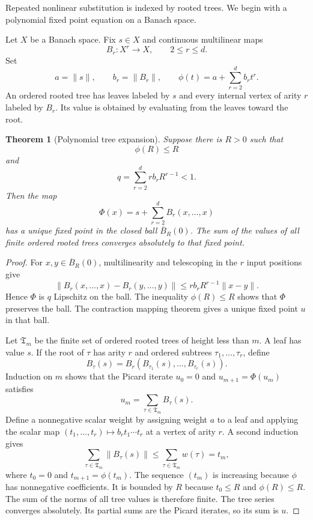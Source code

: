 \documentclass[11pt,a4paper]{article}
\newtheorem{theorem}{Theorem}[section]
\theoremstyle{plain}
\theoremstyle{definition}
\theoremstyle{remark}
\begin{document}
Repeated nonlinear substitution is indexed by rooted trees.  We begin with a polynomial fixed point equation on a Banach space.

Let $X$ be a Banach space.  Fix $s\in X$ and continuous multilinear maps
\[
B_r:X^r\longrightarrow X,
\qquad
2\le r\le d.
\]
Set
\[
a=\|s\|,
\qquad
b_r=\|B_r\|,
\qquad
\phi(t)=a+\sum_{r=2}^{d}b_rt^r.
\]
An ordered rooted tree has leaves labeled by $s$ and every internal vertex of arity $r$ labeled by $B_r$.  Its value is obtained by evaluating from the leaves toward the root.

\begin{theorem}[Polynomial tree expansion]\label{thm:polynomial_tree_expansion}
Suppose there is $R>0$ such that
\[
\phi(R)\le R
\]
and
\[
q=
\sum_{r=2}^{d}r b_rR^{r-1}<1.
\]
Then the map
\[
\Phi(x)=s+\sum_{r=2}^{d}B_r(x,\ldots,x)
\]
has a unique fixed point in the closed ball $\overline B_R(0)$.  The sum of the values of all finite ordered rooted trees converges absolutely to that fixed point.
\end{theorem}

\begin{proof}
For $x,y\in\overline B_R(0)$, multilinearity and telescoping in the $r$ input positions give
\[
\|B_r(x,\ldots,x)-B_r(y,\ldots,y)\|
\le
r b_rR^{r-1}\|x-y\|.
\]
Hence $\Phi$ is $q$ Lipschitz on the ball.  The inequality $\phi(R)\le R$ shows that $\Phi$ preserves the ball.  The contraction mapping theorem gives a unique fixed point $u$ in that ball.

Let $\mathfrak T_m$ be the finite set of ordered rooted trees of height less than $m$.  A leaf has value $s$.  If the root of $\tau$ has arity $r$ and ordered subtrees $\tau_1,\ldots,\tau_r$, define
\[
B_\tau(s)=B_r(B_{\tau_1}(s),\ldots,B_{\tau_r}(s)).
\]
Induction on $m$ shows that the Picard iterate $u_0=0$ and $u_{m+1}=\Phi(u_m)$ satisfies
\[
u_m=\sum_{\tau\in\mathfrak T_m}B_\tau(s).
\]
Define a nonnegative scalar weight by assigning weight $a$ to a leaf and applying the scalar map $(t_1,\ldots,t_r)\mapsto b_rt_1\cdots t_r$ at a vertex of arity $r$.  A second induction gives
\[
\sum_{\tau\in\mathfrak T_m}\|B_\tau(s)\|
\le
\sum_{\tau\in\mathfrak T_m}w(\tau)
=t_m,
\]
where $t_0=0$ and $t_{m+1}=\phi(t_m)$.  The sequence $(t_m)$ is increasing because $\phi$ has nonnegative coefficients.  It is bounded by $R$ because $t_0\le R$ and $\phi(R)\le R$.  The sum of the norms of all tree values is therefore finite.  The tree series converges absolutely.  Its partial sums are the Picard iterates, so its sum is $u$.
\end{proof}
\end{document}
